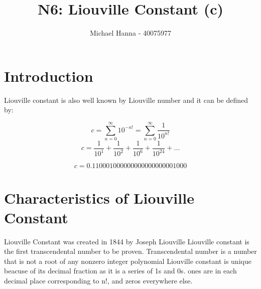\documentclass{article}
\title{N6: Liouville Constant (c)}
\author{Michael Hanna - 40075977}
\date{}
\begin{document}
\maketitle

\section{Introduction}
Liouville constant is also well known by Liouville number and it can be defined by:

\begin{equation}
c =\sum_{n=0}^{\infty} 10^{-n!} = \sum_{n=0}^{\infty}\frac{1}{10^{n!}}
\end{equation}
\begin{equation}
c =\frac{1}{10^1} + \frac{1}{10^2} +\frac{1}{10^6}+ \frac{1}{10^{24}} + ... 
\end{equation}

\begin{equation}
c = 0.110001000000000000000001000
\end{equation}

\section{Characteristics of Liouville Constant}
Liouville Constant was created in 1844 by Joseph Liouville \newline
\newline Liouville constant is the first transcendental number to be proven.\newline
\newline Transcendental number is a number that is not a root of any nonzero integer polynomial\newline
 \newline  Liouville constant is unique beacuse of its decimal fraction as it is a series of 1s and 0s. ones are in each decimal place corresponding to n!, and zeros everywhere else.\citep{lc}


\end{document}
